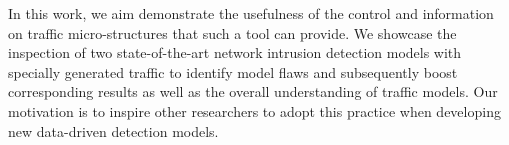 \documentclass[conference]{IEEEtran}
\begin{document}
In this work, we aim demonstrate the usefulness of the control and information on traffic micro-structures that such a tool can provide. We showcase the inspection of two state-of-the-art network intrusion detection models with specially generated traffic to identify model flaws and subsequently boost corresponding results as well as the overall understanding of traffic models. Our motivation is to inspire other researchers to adopt this practice when developing new data-driven detection models.









\end{document}
